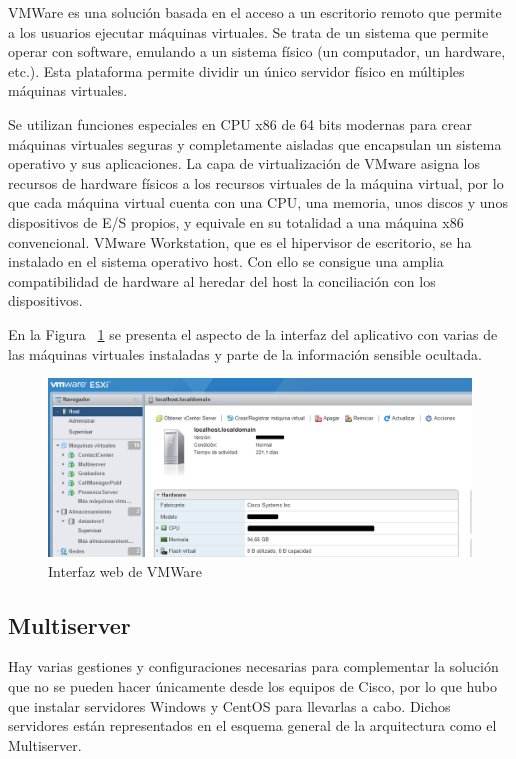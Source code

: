 \documentclass[a4paper, 12pt]{book}
\begin{document}
VMWare es una solución basada en el acceso a un escritorio remoto que permite a los usuarios ejecutar máquinas virtuales. Se trata de un sistema que permite operar con software, emulando a un sistema físico (un computador, un hardware, etc.). Esta plataforma permite dividir un único servidor físico en múltiples máquinas virtuales.

Se utilizan funciones especiales en CPU x86 de 64 bits modernas para crear máquinas virtuales seguras y completamente aisladas que encapsulan un sistema operativo y sus aplicaciones. La capa de virtualización de VMware asigna los recursos de hardware físicos a los recursos virtuales de la máquina virtual, por lo que cada máquina virtual cuenta con una CPU, una memoria, unos discos y unos dispositivos de E/S propios, y equivale en su totalidad a una máquina x86 convencional. VMware Workstation, que es el hipervisor de escritorio, se ha instalado en el sistema operativo host. Con ello se consigue una amplia compatibilidad de hardware al heredar del host la conciliación con los dispositivos.

En la Figura ~\ref{figura:fig_vmware} se presenta el aspecto de la interfaz del aplicativo con varias de las máquinas virtuales instaladas y parte de la información sensible ocultada.

\begin{figure}[h!]
  \centering
  \includegraphics[scale=0.8]{img/fig_vmware}
  \caption{Interfaz web de VMWare}
  \label{figura:fig_vmware}
\end{figure}

\subsection{Multiserver}
\label{sec:multiserver}
Hay varias gestiones y configuraciones necesarias para complementar la solución que no se pueden hacer únicamente desde los equipos de Cisco, por lo que hubo que instalar servidores Windows y CentOS para llevarlas a cabo. Dichos servidores están representados en el esquema general de la arquitectura como el Multiserver.
\end{document}
